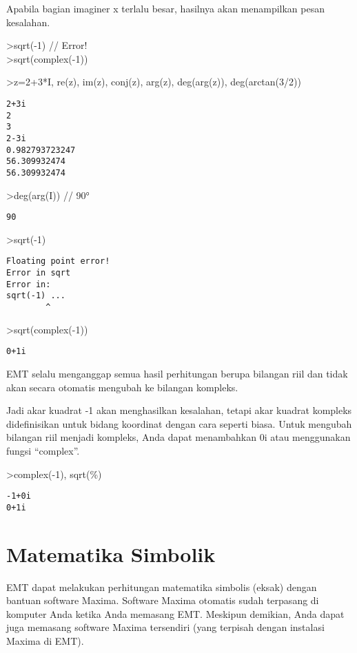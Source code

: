 \documentclass[
]{book}
\begin{document}
Apabila bagian imaginer x terlalu besar, hasilnya akan menampilkan pesan kesalahan.

\textgreater sqrt(-1) // Error!\\
\textgreater sqrt(complex(-1))

\textgreater z=2+3*I, re(z), im(z), conj(z), arg(z), deg(arg(z)), deg(arctan(3/2))

\begin{verbatim}
2+3i
2
3
2-3i
0.982793723247
56.309932474
56.309932474
\end{verbatim}

\textgreater deg(arg(I)) // 90°

\begin{verbatim}
90
\end{verbatim}

\textgreater sqrt(-1)

\begin{verbatim}
Floating point error!
Error in sqrt
Error in:
sqrt(-1) ...
        ^
\end{verbatim}

\textgreater sqrt(complex(-1))

\begin{verbatim}
0+1i
\end{verbatim}

EMT selalu menganggap semua hasil perhitungan berupa bilangan riil dan tidak akan secara otomatis mengubah ke bilangan kompleks.

Jadi akar kuadrat -1 akan menghasilkan kesalahan, tetapi akar kuadrat kompleks didefinisikan untuk bidang koordinat dengan cara seperti biasa. Untuk mengubah bilangan riil menjadi kompleks, Anda dapat menambahkan 0i atau menggunakan fungsi ``complex''.

\textgreater complex(-1), sqrt(\%)

\begin{verbatim}
-1+0i 
0+1i
\end{verbatim}

\chapter{Matematika Simbolik}\label{matematika-simbolik}

EMT dapat melakukan perhitungan matematika simbolis (eksak) dengan bantuan software Maxima. Software Maxima otomatis sudah terpasang di komputer Anda ketika Anda memasang EMT. Meskipun demikian, Anda dapat juga memasang software Maxima tersendiri (yang terpisah dengan instalasi Maxima di EMT).
\end{document}
